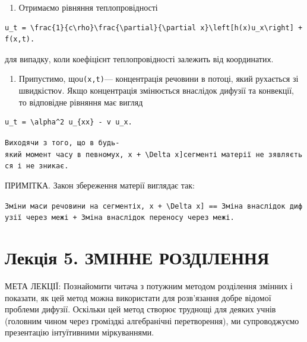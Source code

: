 \documentclass[
  ukrainian,
]{article}
\providecommand{\tightlist}{%
  \setlength{\itemsep}{0pt}\setlength{\parskip}{0pt}}
\begin{document}
\begin{enumerate}
\def\labelenumi{\arabic{enumi}.}
\setcounter{enumi}{2}
\tightlist
\item
  Отримаємо рівняння теплопровідності
\end{enumerate}

\begin{verbatim}
u_t = \frac{1}{c\rho}\frac{\partial}{\partial x}\left[h(x)u_x\right] + f(x,t).
\end{verbatim}

для випадку, коли коефіцієнт теплопровідності залежить від
координати\texttt{x}.

\begin{enumerate}
\def\labelenumi{\arabic{enumi}.}
\setcounter{enumi}{3}
\tightlist
\item
  Припустимо, що\texttt{u(x,t)}--- концентрація речовини в потоці, який
  рухається зі швидкістю\texttt{v}. Якщо концентрація змінюється
  внаслідок дифузії та конвекції, то відповідне рівняння має вигляд
\end{enumerate}

\begin{verbatim}
u_t = \alpha^2 u_{xx} - v u_x.
\end{verbatim}

\texttt{Виходячи\ з\ того,\ що\ в\ будь-який\ момент\ часу\ в\ певному\textquotesingle{}{[}x,\ x\ +\ \textbackslash{}Delta\ x{]}\textquotesingle{}сегменті\ матерії\ не\ з\textquotesingle{}являється\ і\ не\ зникає.}

ПРИМІТКА. Закон збереження матерії виглядає так:

\texttt{Зміни\ маси\ речовини\ на\ сегменті\textquotesingle{}{[}x,\ x\ +\ \textbackslash{}Delta\ x{]}\ =\textquotesingle{}=\ Зміна\ внаслідок\ дифузії\ через\ межі\ +\ Зміна\ внаслідок\ переносу\ через\ межі.}

\section{Лекція 5. ЗМІННЕ
РОЗДІЛЕННЯ}\label{ux43bux435ux43aux446ux456ux44f-5.-ux437ux43cux456ux43dux43dux435-ux440ux43eux437ux434ux456ux43bux435ux43dux43dux44f}

МЕТА ЛЕКЦІЇ: Познайомити читача з потужним методом розділення змінних і
показати, як цей метод можна використати для розв'язання добре відомої
проблеми дифузії. Оскільки цей метод створює труднощі для деяких учнів
(головним чином через громіздкі алгебранічні перетворення), ми
супроводжуємо презентацію інтуїтивними міркуваннями.
\end{document}
